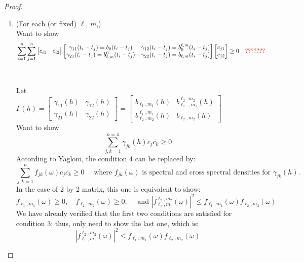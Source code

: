 \documentclass[11pt]{article}
\begin{document}
\begin{itemize}
\begin{proof}
\begin{enumerate}
\item
{\color{red}(For each (or fixed) $\ell$, $m$,)}\\
Want to show\\
\begin{align*}
&\sum_{i=1}^n \sum_{j=1}^n 
\begin{bmatrix}
c_{i1} & c_{i2}
\end{bmatrix}
\begin{bmatrix}
\gamma_{11}(t_i-t_j) = b_0(t_i-t_j) & \gamma_{12}(t_i-t_j) = b_0^{\ell,m}(t_i-t_j)\\ 
\gamma_{21}(t_i-t_j) = b_{\ell,m}^0(t_i-t_j) & \gamma_{22}(t_i-t_j) = b_{\ell,m}(t_i-t_j)
\end{bmatrix}
\begin{bmatrix}
c_{j1}\\
c_{j2} 
\end{bmatrix}
\ge0 \quad{\color{red}???????}
\end{align*}
\\
\\
Let\\
$\Gamma(h)= 
\begin{bmatrix}
\gamma_{11}(h) & \gamma_{12}(h) \\ 
\gamma_{21}(h) & \gamma_{22}(h) 
\end{bmatrix}
=
\begin{bmatrix}
b_{\ell_1,m_1}(h) & b_{\ell_1,,m_1}^{\ell_2,m_2}(h) \\ 
b_{\ell_2,m_2}^{\ell_1,m_1}(h) & b_{\ell_2,m_2}(h) 
\end{bmatrix}$
\\

Want to show\\
$$\sum_{j,k=1}^{n=4} \gamma_{jk}(h) c_j \overline{c_k} \ge 0$$
According to Yaglom, the condition 4 can be replaced by:\\
$$\sum_{j,k=1}^n f_{jk}(\omega) c_j \overline{c_k} \ge 0 \quad \text{ where } f_{jk}(\omega) \text{ is spectral and cross spectral densities for } \gamma_{jk}(h).$$
In the case of 2 by 2 matrix, this one is equivalent to show:\\
$$f_{\ell_1,m_1}(\omega) \ge 0, \quad f_{\ell_2,m_2}(\omega) \ge 0, \quad \text{ and } |f_{\ell_1,m_1}^{\ell_2, m_2}(\omega)|^2 \le f_{\ell_1,m_1}(\omega) f_{\ell_2,m_2}(\omega)$$
We have already verified that the first two conditions are satisfied for condition 3; thus, only need to show the last one, which is:\\
$$|f_{\ell_1,m_1}^{\ell_2, m_2}(\omega)|^2 \le f_{\ell_1,m_1}(\omega) f_{\ell_2,m_2}(\omega)$$


\end{enumerate}
\end{proof}
\end{itemize}
\end{document}
